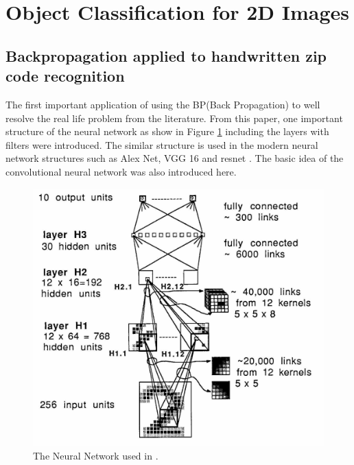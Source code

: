 \documentclass[a4paper,12pt]{article}
\begin{document}

\section{Object Classification for 2D Images}
\subsection{Backpropagation applied to handwritten zip code recognition\cite{doi:10.1162/neco.1989.1.4.541}}
The first important application of using the BP(Back Propagation) to well resolve the real life problem from the literature. From this paper, one important structure of the neural network as show in Figure \ref{fig:bpzip} including the layers with filters were introduced. The similar structure is used in the modern neural network structures such as Alex Net\cite{NIPS2012_4824}, VGG 16  \cite{SimonyanZ14a} and resnet \cite{DBLP:journals/corr/HeZRS15}. The basic idea of the convolutional neural network was also introduced here.\\

\begin{figure}[H]
  \begin{center}
      \includegraphics[scale=0.8]{bpzip.png}
\end{center}
\caption{The Neural Network used in \cite{doi:10.1162/neco.1989.1.4.541}.}
 \label{fig:bpzip}
 \end{figure}
 
\end{document}
